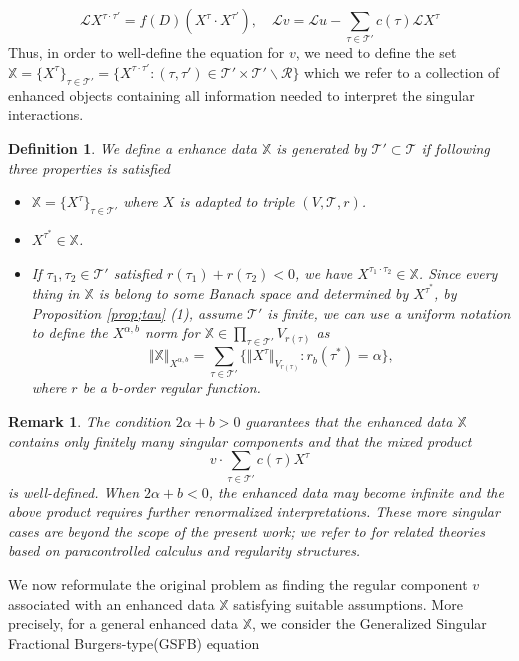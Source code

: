 \documentclass{article}
\newtheorem{definition}{Definition}[section]
\newtheorem{remark}{Remark}[section]
\numberwithin{equation}{section}
\newcommand{\m}{\mathbb}
\newcommand{\ml}{\mathcal}
\begin{document}
\begin{equation}\label{eq;formal calculation}
   \ml LX^{\tau\cdot\tau'}=f(D)(X^{\tau}\cdot X^{\tau'}), \quad \ml Lv=\ml Lu-\sum_{\tau\in\ml T'}c(\tau)\ml LX^{\tau}
\end{equation}
Thus, in order to well-define the equation for $v$, we need to define the set  $\m X=\{X^\tau\}_{\tau\in \ml T'}=\{X^{\tau\cdot \tau'}:(\tau,\tau')\in \ml T'\times \ml T'\backslash\ml R\}$  which we refer to  a collection of enhanced objects containing all information needed to interpret the singular interactions. 
\begin{definition}
     We define a enhance data $\m X$ is generated by $\ml T'\subset \ml T$ if following three properties is satisfied
	 \begin{itemize}
		\item[(1)]{$\m X=\{X^{\tau}\}_{\tau\in\ml T'}$  where $X$ is adapted to triple $(V,\ml T,r)$.}
		\item[(2)]{$X^{\tau^*}\in\m X$.}
		\item[(3)]{If $\tau_1,\tau_2\in\ml T'$ satisfied $r(\tau_1)+r(\tau_2)<0$, we have $X^{\tau_1\cdot\tau_2}\in\m X$.  }
		Since every thing in $\m X$ is belong to some Banach space and determined by $X^{\tau^*}$, by Proposition \ref{prop;tau} (1), assume $\ml T'$ is finite, we can use a uniform notation to define the $X^{\alpha,b}$ norm for $\m X\in \prod_{\tau\in\ml T'}V_{r(\tau)}$ as 
		\begin{equation}
			\Vert \m X\Vert_{X^{\alpha,b}}=\sum_{\tau\in\ml T'} \{\Vert X^{\tau}\Vert_{V_{r(\tau)}}:r_b(\tau^*)=\alpha\},
		\end{equation}
		where $r$ be a $b$-order regular function.
	\end{itemize}
\end{definition}
\begin{remark}
The condition $2\alpha+b>0$ guarantees that the enhanced data $\m X$ contains only finitely many singular components and that the mixed product
\[
v\cdot \sum_{\tau\in\ml T'}c(\tau)X^\tau
\]
is well-defined. When $2\alpha+b<0$, the enhanced data may become infinite and the above product requires further renormalized interpretations. These more singular cases are beyond the scope of the present work; we refer to 
\cite{gubinelli2015paracontrolled,hairer2013solving,hairerTheoryRegularityStructures2014}
for related theories based on paracontrolled calculus and regularity structures.
\end{remark}
We now reformulate the original problem as finding the regular component $v$ associated with an enhanced data $\m X$ satisfying suitable assumptions. More precisely, for a general enhanced data $\m X$, we consider the Generalized Singular Fractional Burgers-type(GSFB) equation
\end{document}

